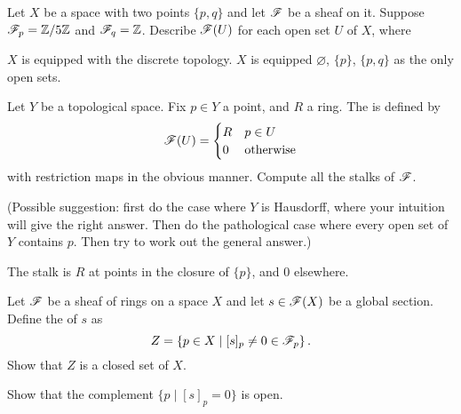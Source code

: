 \begin{problem}
	\label{prob:finite_sheaf}
	Let $X$ be a space with two points $\{p,q\}$
	and let $\mathscr F$ be a sheaf on it.
	Suppose $\mathscr F_p = \mathbb Z/5\mathbb Z$ and $\mathscr F_q = \mathbb Z$.
	Describe $\mathscr F(U)$ for each open set $U$ of $X$, where
	\begin{enumerate}[(a)]
		\ii $X$ is equipped with the discrete topology.
		\ii $X$ is equipped $\varnothing$, $\{p\}$, $\{p,q\}$
		as the only open sets.
	\end{enumerate}
\end{problem}

\begin{problem}
	Let $Y$ be a topological space.
	Fix $p \in Y$ a point, and $R$ a ring.
	The  is defined by
	\[
		\mathscr F(U) = \begin{cases}
			R & p \in U \\
			0 & \text{otherwise}
		\end{cases}
	\]
	with restriction maps in the obvious manner.
	Compute all the stalks of $\mathscr F$.

	(Possible suggestion: first do the case where $Y$ is Hausdorff,
	where your intuition will give the right answer.
	Then do the pathological case where every open set of $Y$ contains $p$.
	Then try to work out the general answer.)
	\begin{hint}
		The stalk is $R$ at points in the closure of $\{p\}$, and $0$ elsewhere.
	\end{hint}
\end{problem}

\begin{problem}
	Let $\mathscr F$ be a sheaf of rings on a space $X$ and let $s \in \mathscr F(X)$
	be a global section.
	Define the  of $s$ as
	\[ Z = \left\{ p \in X \mid [s]_p \neq 0 \in \mathscr F_p \right\}. \]
	Show that $Z$ is a closed set of $X$.
	\begin{hint}
		Show that the complement $\{ p \mid [s]_p = 0 \}$ is open.
	\end{hint}
\end{problem}

%
